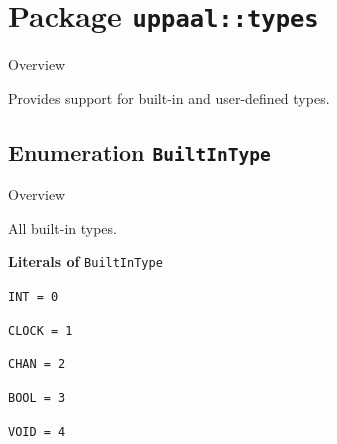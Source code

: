 			\newpage
		\section{Package \bfseries \texttt{uppaal::types}\normalfont}
		
		\begin{longdescription}
		\item[Overview]			
				

	

		Provides support for built-in and user-defined types.		
		\end{longdescription}
	

\subsection{Enumeration \bfseries \texttt{BuiltInType}\normalfont}
\label{cls:uppaal::types::BuiltInType} 

	\begin{longdescription}
		\item[Overview] 		
				

	

		All built-in types.		
	
		\item[\textbf{Literals of} \texttt{BuiltInType}] ~
		\begin{longdescription}
			
\item[\texttt{INT = 0}] ~
\nopagebreak

\item[\texttt{CLOCK = 1}] ~
\nopagebreak

\item[\texttt{CHAN = 2}] ~
\nopagebreak

\item[\texttt{BOOL = 3}] ~
\nopagebreak

\item[\texttt{VOID = 4}] ~
\nopagebreak
		\end{longdescription}
	\end{longdescription}
	
